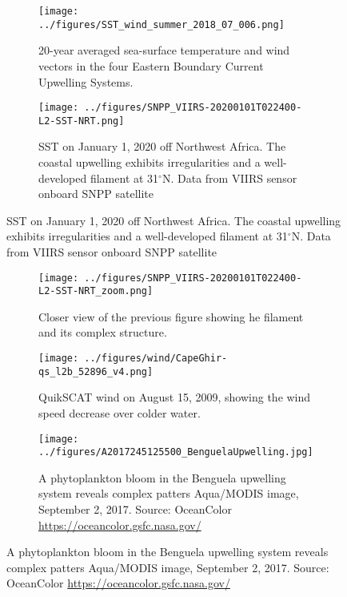 \documentclass[final,table,svgnames]{article}
\begin{document}
\pagestyle{empty}

\begin{figure}
\centering
\begin{subfigure}[t]{\textwidth}
\caption{20-year averaged sea-surface temperature and wind vectors in the four Eastern Boundary Current Upwelling Systems.}
\texttt{[image: ../figures/SST\_wind\_summer\_2018\_07\_006.png]}
\end{subfigure}



\begin{subfigure}[t]{.75\textwidth}
\caption{SST on January 1, 2020 off Northwest Africa. The coastal upwelling exhibits irregularities and a well-developed filament at 31$^{\circ}$N. Data from VIIRS sensor onboard SNPP satellite}
\texttt{[image: ../figures/SNPP\_VIIRS-20200101T022400-L2-SST-NRT.png]}
\end{subfigure}

\end{figure}

\begin{figure}[t]\ContinuedFloat
\centering
\begin{subfigure}[t]{.75\textwidth}
\caption{Closer view of the previous figure showing he filament and its complex structure.}
\texttt{[image: ../figures/SNPP\_VIIRS-20200101T022400-L2-SST-NRT\_zoom.png]}
\end{subfigure}

\begin{subfigure}[t]{.45\textwidth}
\caption{QuikSCAT wind on August 15, 2009, showing the wind speed decrease over colder water.}
\texttt{[image: ../figures/wind/CapeGhir-qs\_l2b\_52896\_v4.png]}
\end{subfigure}\hspace*{.25cm}
\begin{subfigure}[t]{.45\textwidth}
\caption{A phytoplankton bloom in the Benguela upwelling system reveals complex patters Aqua/MODIS image, September 2, 2017. Source: OceanColor \url{https://oceancolor.gsfc.nasa.gov/}}
\texttt{[image: ../figures/A2017245125500\_BenguelaUpwelling.jpg]}
\end{subfigure}




\end{figure}
\end{document}
